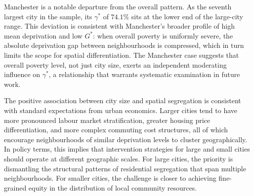 \documentclass[11pt,journal,compsoc]{IEEEtran}
\begin{document}
Manchester is a notable departure from the overall pattern. As the seventh largest city in the sample, its $\gamma^*$ of $74.1\%$ sits at the lower end of the large-city range. This deviation is consistent with Manchester's broader profile of high mean deprivation and low $G^*$: when overall poverty is uniformly severe, the absolute deprivation gap between neighbourhoods is compressed, which in turn limits the scope for spatial differentiation. The Manchester case suggests that overall poverty level, not just city size, exerts an independent moderating influence on $\gamma^*$, a relationship that warrants systematic examination in future work.

The positive association between city size and spatial segregation is consistent with standard expectations from urban economics. Larger cities tend to have more pronounced labour market stratification, greater housing price differentiation, and more complex commuting cost structures, all of which encourage neighbourhoods of similar deprivation levels to cluster geographically. In policy terms, this implies that intervention strategies for large and small cities should operate at different geographic scales. For large cities, the priority is dismantling the structural patterns of residential segregation that span multiple neighbourhoods. For smaller cities, the challenge is closer to achieving fine-grained equity in the distribution of local community resources.




\end{document}
